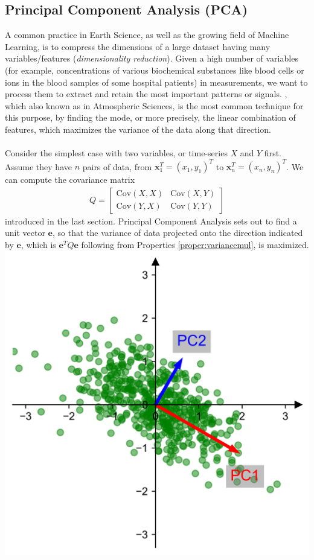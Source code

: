 \subsection{Principal Component Analysis (PCA)}
A common practice in Earth Science, as well as the growing field of Machine Learning, is to compress the dimensions of a large dataset having many variables/features (\textit{dimensionality reduction}). Given a high number of variables (for example, concentrations of various biochemical substances like blood cells or ions in the blood samples of some hospital patients) in measurements, we want to process them to extract and retain the most important patterns or signals. , which also known as  in Atmospheric Sciences, is the most common technique for this purpose, by finding the mode, or more precisely, the linear combination of features, which maximizes the variance of the data along that direction. \\
\\
Consider the simplest case with two variables, or time-series $X$ and $Y$ first. Assume they have $n$ pairs of data, from $\textbf{x}_1^T = (x_1, y_1)^T$ to $\textbf{x}_n^T = (x_{n}, y_{n})^T$. We can compute the covariance matrix
\begin{align*}
Q = \begin{bmatrix}
\text{Cov}(X, X) & \text{Cov}(X, Y) \\
\text{Cov}(Y, X) & \text{Cov}(Y, Y) 
\end{bmatrix}
\end{align*}
introduced in the last section. Principal Component Analysis sets out to find a unit vector $\textbf{e}$, so that the variance of data projected onto the direction indicated by $\textbf{e}$, which is $\textbf{e}^T Q \textbf{e}$ following from Properties \ref{proper:variancemul}, is maximized.
\includegraphics{graphics/PCA_first_demo.png}\\
